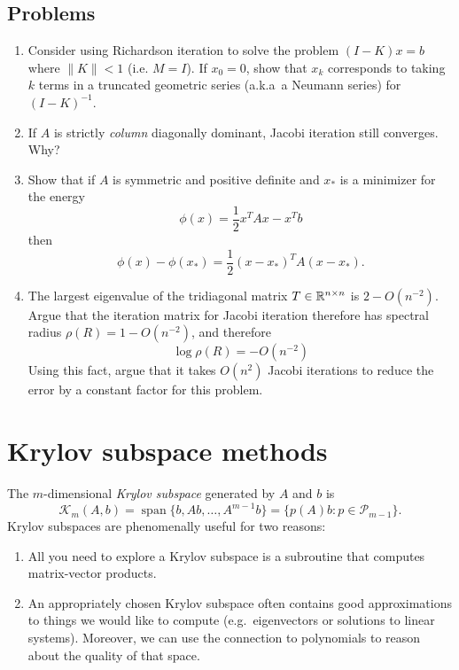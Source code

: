 \documentclass[12pt, leqno]{article}
\newcommand{\calK}{\mathcal{K}}
\newcommand{\calP}{\mathcal{P}}
\begin{document}
\subsection{Problems}

\begin{enumerate}
\item
  Consider using Richardson iteration to solve the problem
  $(I-K) x = b$ where $\|K\| < 1$ (i.e. $M = I$).  If $x_0 = 0$,
  show that $x_k$ corresponds to taking $k$ terms in a truncated
  geometric series (a.k.a~a Neumann series) for $(I-K)^{-1}$.
\item
  If $A$ is strictly {\em column} diagonally dominant, Jacobi
  iteration still converges.  Why?
\item
  Show that if $A$ is symmetric and positive definite and
  $x_*$ is a minimizer for the energy
  \[
    \phi(x) = \frac{1}{2} x^T A x - x^T b
  \]
  then
  \[
    \phi(x)-\phi(x_*) = \frac{1}{2} (x-x_*)^T A (x-x_*).
  \]
\item
  The largest eigenvalue of the tridiagonal matrix
  $T \in \mathbb{R}^{n \times n}$ is $2 - O(n^{-2})$.
  Argue that the iteration matrix for Jacobi iteration therefore
  has spectral radius $\rho(R) = 1-O(n^{-2})$, and therefore
  \[
    \log \rho(R) = -O(n^{-2})
  \]
  Using this fact, argue that it takes $O(n^2)$ Jacobi iterations
  to reduce the error by a constant factor for this problem.
\end{enumerate}

\newpage
\section{Krylov subspace methods}

The $m$-dimensional {\em Krylov subspace} generated by $A$ and $b$ is
\[
  \calK_m(A,b)
    = \operatorname{span}\{ b, Ab, \ldots, A^{m-1} b \}
    = \{ p(A) b : p \in \calP_{m-1} \}.
\]
Krylov subspaces are phenomenally useful for two reasons:
\begin{enumerate}
\item
  All you need to explore a Krylov subspace is a subroutine
  that computes matrix-vector products.
\item
  An appropriately chosen Krylov subspace often contains good
  approximations to things we would like to compute (e.g.~eigenvectors
  or solutions to linear systems).  Moreover, we can use the
  connection to polynomials to reason about the quality of that space.
\end{enumerate}
\end{document}

